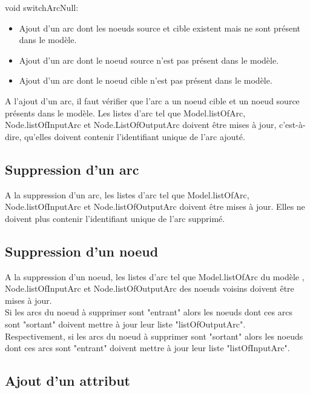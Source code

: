\documentclass{article}
\begin{document}
void switchArcNull:

\begin{itemize}
\item Ajout d'un arc dont les noeuds source et cible existent mais ne sont pr\'esent dans le mod\`ele.

\item Ajout d'un arc dont le noeud source n'est pas pr\'esent dans le mod\`ele.

\item Ajout d'un arc dont le noeud cible n'est pas pr\'esent dans le mod\`ele.\\

\end{itemize}

A l'ajout d'un arc, il faut v\'erifier que l'arc a un noeud cible et un noeud source pr\'esents dans le mod\`ele.
Les listes d'arc tel que Model.listOfArc,
Node.listOfInputArc et Node.ListOfOutputArc doivent \^etre mises \`a jour, c'est-\`a-dire,
qu'elles doivent contenir l'identifiant unique de l'arc ajout\'e.

\subsection{Suppression d'un arc}

A la suppression d'un arc, les listes d'arc tel que Model.listOfArc,\\
Node.listOfInputArc et Node.listOfOutputArc doivent \^etre mises \`a jour.
Elles ne doivent plus contenir l'identifiant unique de l'arc supprim\'e.

\subsection{Suppression d'un noeud}

A la suppression d'un noeud, les listes d'arc tel que Model.listOfArc du mod\`ele ,
Node.listOfInputArc et Node.listOfOutputArc des noeuds voisins
doivent \^etre mises \`a jour.\\

Si les arcs du noeud \`a supprimer sont "entrant" alors les noeuds dont ces arcs 
sont "sortant" doivent mettre \`a jour leur liste "listOfOutputArc".\\

Respectivement, si les arcs du noeud \`a supprimer sont "sortant" 
alors les noeuds dont ces arcs sont "entrant" doivent mettre \`a jour leur liste "listOfInputArc".

\subsection{Ajout d'un attribut}
\end{document}
